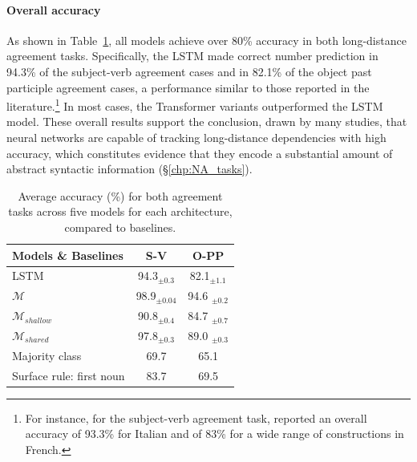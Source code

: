 \paragraph{Overall accuracy} As shown in Table~\ref{tab:overall_accu}, all models achieve over 80\% accuracy in both long-distance agreement tasks. Specifically, the LSTM made correct number prediction in 94.3\% of the subject-verb agreement cases and in 82.1\% of the object past participle
agreement cases, a performance similar to those reported in the
literature.\footnote{For instance, for the subject-verb agreement
  task, \cite{gulordava-etal-2018-colorless} reported an overall
  accuracy of 93.3\% for Italian and \cite{mueller-etal-2020-cross} of 83\% for a wide range of constructions in French.} 
In most cases, the Transformer variants outperformed the LSTM model. These overall results support
the conclusion, drawn by many studies, that neural networks are capable of tracking long-distance dependencies with high accuracy, which constitutes evidence that they encode a substantial amount of abstract syntactic information (\S\ref{chp:NA_tasks}).

\begin{table}[ht]
\centering
  \begin{tabular}{lcc}
    \toprule
    Models \& Baselines  & S-V & O-PP  \\
    \midrule
    LSTM & 94.3$_{\pm 0.3}$ & 82.1$_{\pm 1.1}$\\
    $\mathcal{M}$ & 98.9$_{\pm 0.04}$ & 94.6 $_{\pm 0.2}$\\
    $\mathcal{M}_{shallow}$ & 90.8$_{\pm 0.4}$ & 84.7 $_{\pm 0.7}$\\
    $\mathcal{M}_{shared}$ & 97.8$_{\pm 0.3}$ & 89.0 $_{\pm 0.3}$\\
    \midrule
    Majority class & 69.7 & 65.1 \\
    \midrule
    Surface rule: first noun     & 83.7   & 69.5 \\
    \bottomrule
  \end{tabular}
\caption{Average accuracy (\%) for both agreement tasks across five models for each architecture, compared to baselines. \label{tab:overall_accu}}
\centering
\end{table}

